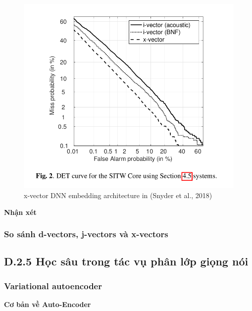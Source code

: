 \documentclass{article}
\begin{document}
	\begin{figure}[H]
		\centering
		\includegraphics[width=0.75\linewidth]{images/x-vectors-fig-02.png}
		\caption{x-vector DNN embedding architecture in (Snyder et al., 2018)}
		\label{fig:writing-thesis}
	\end{figure}
	
	\textbf{Nhận xét}
	
	\subsubsection{So sánh d-vectors, j-vectors và x-vectors}
	
	\subsection{D.2.5 Học sâu trong tác vụ phân lớp giọng nói}
	\subsubsection{Variational autoencoder}
	\textbf{Cơ bản về Auto-Encoder}
	
	
\end{document}
